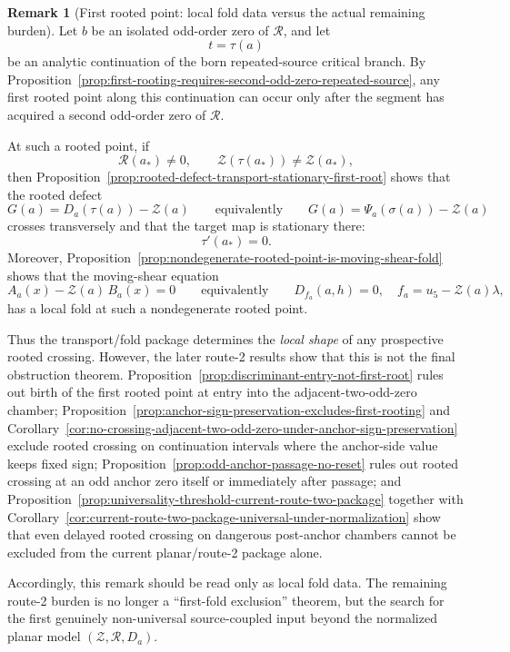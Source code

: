 \documentclass[11pt,a4paper]{amsart}
\theoremstyle{plain}
\theoremstyle{definition}
\newtheorem{remark}[theorem]{Remark}
\begin{document}
\begin{remark}[First rooted point: local fold data versus the actual remaining burden]
\label{rem:first-rooted-point-post-birth-fold-problem}
Let $b$ be an isolated odd-order zero of $\mathcal R$, and let
\[
t=\tau(a)
\]
be an analytic continuation of the born repeated-source critical branch. By
Proposition~\ref{prop:first-rooting-requires-second-odd-zero-repeated-source},
any first rooted point along this continuation can occur only after the segment
has acquired a second odd-order zero of $\mathcal R$.

At such a rooted point, if
\[
\mathcal R(a_*)\neq 0,
\qquad
\mathcal Z(\tau(a_*))\neq \mathcal Z(a_*),
\]
then
Proposition~\ref{prop:rooted-defect-transport-stationary-first-root} shows that
the rooted defect
\[
G(a)=D_a(\tau(a))-\mathcal Z(a)
\qquad
\text{equivalently}\qquad
G(a)=\Psi_a(\sigma(a))-\mathcal Z(a)
\]
crosses transversely and that the target map is stationary there:
\[
\tau'(a_*)=0.
\]
Moreover,
Proposition~\ref{prop:nondegenerate-rooted-point-is-moving-shear-fold} shows
that the moving-shear equation
\[
A_a(x)-\mathcal Z(a)\,B_a(x)=0
\qquad\text{equivalently}\qquad
D_{f_a}(a,h)=0,
\quad
f_a=u_5-\mathcal Z(a)\lambda,
\]
has a local fold at such a nondegenerate rooted point.

Thus the transport/fold package determines the \emph{local shape} of any
prospective rooted crossing. However, the later route-2 results show that this
is not the final obstruction theorem. Proposition~\ref{prop:discriminant-entry-not-first-root}
rules out birth of the first rooted point at entry into the adjacent-two-odd-zero
chamber; Proposition~\ref{prop:anchor-sign-preservation-excludes-first-rooting}
and Corollary~\ref{cor:no-crossing-adjacent-two-odd-zero-under-anchor-sign-preservation}
exclude rooted crossing on continuation intervals where the anchor-side value
keeps fixed sign; Proposition~\ref{prop:odd-anchor-passage-no-reset} rules out
rooted crossing at an odd anchor zero itself or immediately after passage; and
Proposition~\ref{prop:universality-threshold-current-route-two-package}
together with
Corollary~\ref{cor:current-route-two-package-universal-under-normalization}
show that even delayed rooted crossing on dangerous post-anchor chambers cannot
be excluded from the current planar/route-2 package alone.

Accordingly, this remark should be read only as local fold data. The remaining
route-2 burden is no longer a ``first-fold exclusion'' theorem, but the search
for the first genuinely non-universal source-coupled input beyond the normalized
planar model $(\mathcal Z,\mathcal R,D_a)$.
\end{remark}
\end{document}
